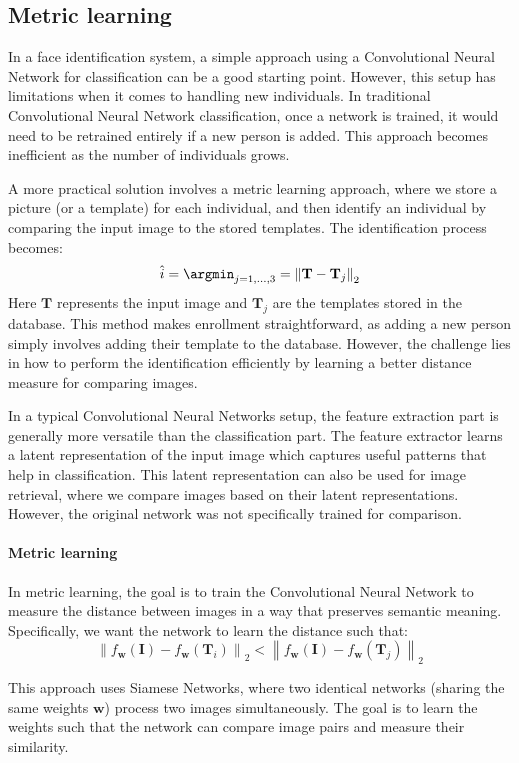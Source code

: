 \subsection{Metric learning}
In a face identification system, a simple approach using a Convolutional Neural Network for classification can be a good starting point.
However, this setup has limitations when it comes to handling new individuals. 
In traditional Convolutional Neural Network classification, once a network is trained, it would need to be retrained entirely if a new person is added. This approach becomes inefficient as the number of individuals grows.

A more practical solution involves a metric learning approach, where we store a picture (or a template) for each individual, and then identify an individual by comparing the input image to the stored templates. 
The identification process becomes:
\[\hat{i}=\argmin_{j=1,\dots,3}={\left\lVert \mathbf{T}-\mathbf{T}_j\right\rVert}_2 \]
Here $\mathbf{T}$ represents the input image and $\mathbf{T}_j$ are the templates stored in the database.
This method makes enrollment straightforward, as adding a new person simply involves adding their template to the database. 
However, the challenge lies in how to perform the identification efficiently by learning a better distance measure for comparing images.

In a typical Convolutional Neural Networks setup, the feature extraction part is generally more versatile than the classification part. 
The feature extractor learns a latent representation of the input image which captures useful patterns that help in classification.
This latent representation can also be used for image retrieval, where we compare images based on their latent representations.
However, the original network was not specifically trained for comparison. 

\paragraph*{Metric learning}
In metric learning, the goal is to train the Convolutional Neural Network to measure the distance between images in a way that preserves semantic meaning. 
Specifically, we want the network to learn the distance such that:
\[{\left\lVert f_{\mathbf{w}}(\mathbf{I})-f_{\mathbf{w}}(\mathbf{T}_i)\right\rVert}_2<{\left\lVert f_{\mathbf{w}}(\mathbf{I})-f_{\mathbf{w}}(\mathbf{T}_j)\right\rVert}_2\]

\noindent This approach uses Siamese Networks, where two identical networks (sharing the same weights $\mathbf{w}$) process two images simultaneously. 
The goal is to learn the weights such that the network can compare image pairs and measure their similarity.

